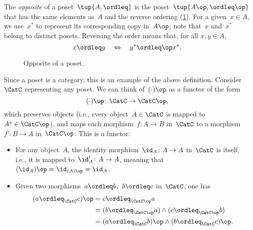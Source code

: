 \begin{example}
    The \emph{opposite} of a  poset~$\tup{A, \ordleq} $ is the poset~$\tup{A\op, \ordleq\op}$ that has the same elements as~$A$ and the reverse ordering (\cref{fig:opposite}).
    For a given~$x \in A$, we use~$x^*$ to represent its corresponding copy in~$A\op$;
    note that~$x$ and~$x^*$ belong to distinct posets.
    Reversing the order means that, for all $x,y\in A$,
    \begin{equation}
        x \ordleq y \quad \Leftrightarrow \quad y^* \ordleq\op x^*.
    \end{equation}
    \begin{figure}[tbh]
   \centering
   \caption{Opposite of a poset.\label{fig:opposite}}
\end{figure}
Since a poset is a category, this is an example of the above definition. Consider~$\CatC$ representing any poset. We can think of~$(\cdot)\op$ as a functor of the form
\begin{equation}
    (\cdot)\op\colon \CatC \to \CatC\op,
\end{equation}
which preserves objects (i.e., every object~$A \in \CatC$ is mapped to~$A^*\in \CatC\op$), and maps each morphism~$f\colon A\to B$ in~$\CatC$ to a morphism~$f'\colon B\to A$ in~$\CatC\op$. This is a functor:
\begin{itemize}
    \item For any object~$A$, the identity morphism~$\id_A\colon A\to A$ in~$\CatC$ is itself, i.e., it is mapped to~$\id_A'\colon A\to A$, meaning that~$(\id_A)\op=\id_{(A)\op}=\id_A$.
    \item Given two morphisms~$a\ordleq b$,~$b\ordleq c$ in~$\CatC$, one has
    \begin{equation}
        \begin{aligned}
        (a\ordleq_{\CatC} c)\op &=c\ordleq_{\CatC\op} a\\
        &=(b\ordleq_{\CatC\op} a)\wedge (c\ordleq_{\CatC\op}b)\\
        &=(a\ordleq_{\CatC} b)\op \wedge (b\ordleq_{\CatC} c)\op.
        \end{aligned}
    \end{equation}
\end{itemize}
\end{example}

